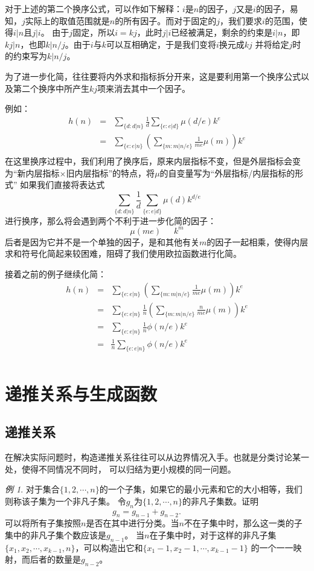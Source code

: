 \documentclass[a4paper,11pt]{article}%
\theoremstyle{remark}
\theoremstyle{remark}
\newtheorem*{example}{例}
\theoremstyle{definition}
\theoremstyle{definition}
\theoremstyle{definition}
\begin{document}
        对于上述的第二个换序公式，可以作如下解释：$i$是$n$的因子，$j$又是$i$的因子，易知，$j$实际上的取值范围就是$n$的所有因子。而对于固定的$j$，我们要求$i$的范围，使得$i|n$且$j|i$。
         由于$j$固定，所以$i=kj$，此时$j|i$已经被满足，剩余的约束是$i|n$，即$kj|n$，也即$k|n/j$。由于$i$与$k$可以互相确定，于是我们变将$i$换元成$kj$
         并将给定$j$时的约束写为$k|n/j$。

         为了进一步化简，往往要将内外求和指标拆分开来，这是要利用第一个换序公式以及第二个换序中所产生$kj$项来消去其中一个因子。
         
         例如：
         \[ 
            \begin{array}{rcl}
                h(n)&=&\sum_{\{d:d|n\}}\frac{1}{d}\sum_{\{e:e|d\}} \mu(d/e)k^e\\
                &=&\sum_{\{e:e|n\}}\left(\sum_{\{m:m|n/e\}}\frac{1}{me}\mu(m)\right)k^e\\
            \end{array}\]
            在这里换序过程中，我们利用了换序后，原来内层指标不变，但是外层指标会变为“新内层指标$\times$旧内层指标”的特点，将$\mu$的自变量写为“外层指标/内层指标的形式”
            如果我们直接将表达式
            \[\sum_{\{d:d|n\}}\frac{1}{d}\sum_{\{e:e|d\}} \mu(d)k^{d/e}\]
            进行换序，那么将会遇到两个不利于进一步化简的因子：
            \[\mu(me)\phantom{111}k^{m}\]
            后者是因为它并不是一个单独的因子，是和其他有关$m$的因子一起相乘，使得内层求和符号化简起来较困难，阻碍了我们使用欧拉函数进行化简。
        
            接着之前的例子继续化简：
         \[ 
            \begin{array}{rcl}
                h(n)&=&\sum_{\{e:e|n\}}\left(\sum_{\{m:m|n/e\}}\frac{1}{me}\mu(m)\right)k^e\\
                &=&\sum_{\{e:e|n\}}\frac{1}{n}\left(\sum_{\{m:m|n/e\}}\frac{n}{me}\mu(m)\right)k^e\\
                &=&\sum_{\{e:e|n\}}\frac{1}{n}\phi(n/e)k^e\\
                &=&\frac{1}{n}\sum_{\{e:e|n\}}\phi(n/e)k^e\\
            \end{array}\]
\section{递推关系与生成函数}
\subsection{递推关系}
在解决实际问题时，构造递推关系往往可以从边界情况入手。也就是分类讨论某一处，使得不同情况不同时，
可以归结为更小规模的同一问题。
\begin{example}
    对于集合$\{1,2,\cdots,n\}$的一个子集，如果它的最小元素和它的大小相等，我们则称该子集为一个非凡子集。
    令$g_n$为$\{1,2,\cdots,n\}$的非凡子集数。证明 
    \[g_n=g_{n-1}+g_{n-2}.\phantom{n\geq 3}\]
    可以将所有子集按照$n$是否在其中进行分类。当$n$不在子集中时，那么这一类的子集中的非凡子集个数应该是$g_{n-1}$。
    当$n$在子集中时，对于这样的非凡子集$\{x_1,x_2,\cdots,x_{k-1},n\}$，可以构造出它和$\{x_1-1,x_2-1,\cdots,x_{k-1}-1\}$
    的一个一一映射，而后者的数量是$g_{n-2}$。
\end{example}
\end{document}
